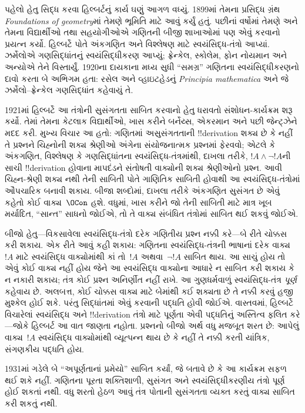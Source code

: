 \documentclass[../../../include/open-logic-section]{subfiles}
\begin{document}
પહેલો હેતુ સિદ્ધ કરવા હિલ્બર્ટનું કાર્ય ઘણું આગળ
વધ્યું. 1899માં તેમના પ્રસિદ્ધ ગ્રંથ \emph{Foundations
of geometry}માં તેમણે ભૂમિતિ માટે આવું કર્યું હતું.
પછીનાં વર્ષોમાં તેમણે અને તેમના વિદ્યાર્થીઓ તથા
સહયોગીઓએ ગણિતની બીજી શાખાઓમાં પણ એવું કરવાનો
પ્રયત્ન કર્યો. હિલ્બર્ટે પોતે અંકગણિત અને વિશ્લેષણ
માટે સ્વયંસિદ્ધ-તંત્રો આપ્યાં. ઝર્મેલોએ ગણસિદ્ધાંતનું
સ્વયંસિદ્ધીકરણ આપ્યું; ફ્રેન્કેલ, સ્કોલેમ,
ફોન નોયમાન અને અન્યોએ તેને વિસ્તાર્યું. 1920ના
દાયકાના મધ્ય સુધી ``સમગ્ર'' ગણિતના સ્વયંસિદ્ધીકરણનો
દાવો કરતા બે અભિગમ હતા: રસેલ અને વ્હાઇટહેડનું
\emph{Principia mathematica} અને જે ઝર્મેલો--ફ્રેન્કેલ
ગણસિદ્ધાંત કહેવાયું તે.

1921માં હિલ્બર્ટે આ તંત્રોની સુસંગતતા સાબિત કરવાનો
હેતુ ધરાવતો સંશોધન-કાર્યક્રમ શરૂ કર્યો. તેમાં તેમના
કેટલાક વિદ્યાર્થીઓ, ખાસ કરીને બર્નેય્સ, એકરમાન
અને પછી જેન્ટ્ઝેને મદદ કરી. મુખ્ય વિચાર આ હતો:
ગણિતમાં અસુસંગતતાની !!{derivation} શક્ય છે કે નહીં
તે પ્રશ્નને ચિહ્નોની શક્ય શ્રેણીઓ અંગેના સંયોજનાત્મક
પ્રશ્નમાં ફેરવવો; એટલે કે અંકગણિત, વિશ્લેષણ કે
ગણસિદ્ધાંતના સ્વયંસિદ્ધ-તંત્રમાંથી, દાખલા તરીકે,
$!A \land \lnot !A$ની સાચી !!{derivation} હોવાના
માપદંડને સંતોષતી વાક્યોની શક્ય શ્રેણીઓનો પ્રશ્ન.
આવી ચિહ્ન-શ્રેણી શક્ય નથી તેની સાબિતી પોતે ગાણિતિક
સાબિતી હોવાથી આ સ્વયંસિદ્ધ-તંત્રોમાં ઔપચારિક બનાવી
શકાય. બીજા શબ્દોમાં, દાખલા તરીકે અંકગણિત સુસંગત
છે એવું કહેતો કોઈ વાક્ય~$\OCon$ હશે. વધુમાં,
ખાસ કરીને જો તેની સાબિતી માટે માત્ર ખૂબ મર્યાદિત,
``સાન્ત'' સાધનો જોઈએ, તો તે વાક્ય સંબંધિત તંત્રોમાં
સાબિત થઈ શકવું જોઈએ.

બીજો હેતુ—વિકસાવેલા સ્વયંસિદ્ધ-તંત્રો દરેક ગણિતીય
પ્રશ્ન નક્કી કરે—બે રીતે ચોક્કસ કરી શકાય. એક રીતે
આવું કહી શકાય: ગણિતના સ્વયંસિદ્ધ-તંત્રની ભાષાનાં
દરેક વાક્ય~$!A$ માટે સ્વયંસિદ્ધ વાક્યોમાંથી
કાં તો~$!A$ અથવા~$\lnot !A$ સાબિત થાય.
આ સાચું હોય તો એવું કોઈ વાક્ય નહીં હોય જેને
આ સ્વયંસિદ્ધ વાક્યોના આધારે ન સાબિત કરી શકાય
કે ન નકારી શકાય; તંત્ર કોઈ પ્રશ્ન અનિર્ણીત નહીં
રાખે. આ ગુણધર્મવાળું સ્વયંસિદ્ધ-તંત્ર
\emph{પૂર્ણ} કહેવાય છે. અલબત્ત, કોઈ ચોક્કસ
વાક્ય માટે બેમાંથી કઈ શક્યતા છે તે નક્કી કરવું
હજી મુશ્કેલ હોઈ શકે. પરંતુ સિદ્ધાંતમાં એવું
કરવાની પદ્ધતિ હોવી જોઈએ. વાસ્તવમાં, હિલ્બર્ટે
વિચારેલાં સ્વયંસિદ્ધ અને !!{derivation} તંત્રો માટે
પૂર્ણતા એવી પદ્ધતિનું અસ્તિત્વ ફલિત કરે—જોકે
હિલ્બર્ટ આ વાત જાણતા નહોતા. પ્રશ્નનો બીજો
અર્થ વધુ મજબૂત શરત છે: આપેલું વાક્ય~$!A$
સ્વયંસિદ્ધ વાક્યોમાંથી વ્યૂત્પન્ન થાય છે કે નહીં
તે નક્કી કરતી યાંત્રિક, સંગણકીય પદ્ધતિ હોય.

1931માં ગડેલે બે ``અપૂર્ણતાનાં પ્રમેયો'' સાબિત
કર્યાં, જે બતાવે છે કે આ કાર્યક્રમ સફળ થઈ
શકે નહીં. ગણિતના પૂરતા શક્તિશાળી,
સુસંગત અને સ્વયંસિદ્ધીકરણીય તંત્રો પૂર્ણ
હોઈ શકતાં નથી. વધુ શરતો હેઠળ આવું તંત્ર
પોતાની સુસંગતતા વ્યક્ત કરતું વાક્ય સાબિત
કરી શકતું નથી.
\end{document}
